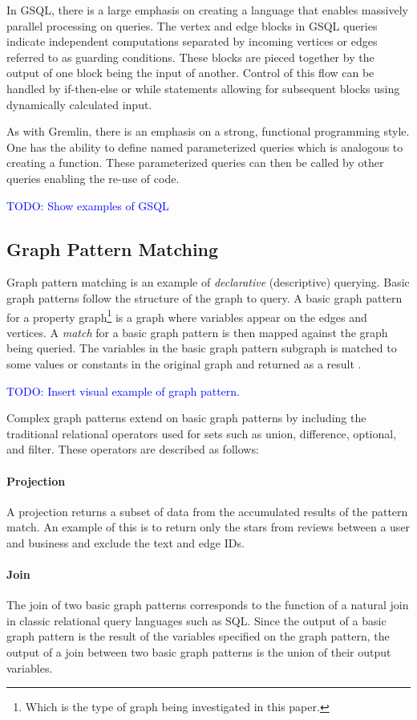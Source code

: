 In GSQL, there is a large emphasis on creating a language that enables massively parallel processing on queries. The vertex and edge blocks in GSQL queries indicate independent computations separated by incoming vertices or edges referred to as guarding conditions. These blocks are pieced together by the output of one block being the input of another. Control of this flow can be handled by if-then-else or while statements allowing for subsequent blocks using dynamically calculated input.

As with Gremlin, there is an emphasis on a strong, functional programming style. One has the ability to define named parameterized queries which is analogous to creating a function. These parameterized queries can then be called by other queries enabling the re-use of code.

\textcolor{blue}{TODO: Show examples of GSQL}

\subsection{Graph Pattern Matching}

Graph pattern matching is an example of \emph{declarative} (descriptive) querying. Basic graph patterns follow the structure of the graph to query. A basic graph pattern for a property graph\footnote{Which is the type of graph being investigated in this paper.} is a graph where variables appear on the edges and vertices. A \emph{match} for a basic graph pattern is then mapped against the graph being queried. The variables in the basic graph pattern subgraph is matched to some values or constants in the original graph and returned as a result \cite{foundations-of-modern-gql}.

\textcolor{blue}{ TODO: Insert visual example of graph pattern.}

Complex graph patterns extend on basic graph patterns by including the traditional relational operators used for sets such as union, difference, optional, and filter. These operators are described as follows:

\paragraph{Projection} A projection returns a subset of data from the accumulated results of the pattern match. An example of this is to return only the stars from reviews between a user and business and exclude the text and edge IDs.

\paragraph{Join} The join of two basic graph patterns corresponds to the function of a natural join in classic relational query languages such as SQL. Since the output of a basic graph pattern is the result of the variables specified on the graph pattern, the output of a join between two basic graph patterns is the union of their output variables.

